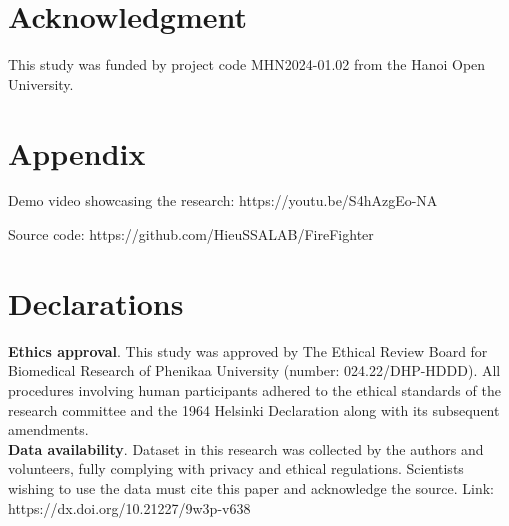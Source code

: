 \documentclass[journal,twoside,web]{ieeecolor}
\begin{document}
\section*{Acknowledgment}
This study was funded by project code MHN2024-01.02 from the Hanoi Open University.

\section*{Appendix}\label{Appendix}
Demo video showcasing the research: https://youtu.be/S4hAzgEo-NA

Source code: https://github.com/HieuSSALAB/FireFighter
\section*{Declarations}\label{Declarations}
\textbf{Ethics approval}. This study was approved by The Ethical Review Board for Biomedical Research of Phenikaa University (number: 024.22/DHP-HDDD). All procedures involving human participants adhered to the ethical standards of the research committee and the 1964 Helsinki Declaration along with its subsequent amendments.\\

\textbf{Data availability}. Dataset in this research was collected by the authors and volunteers, fully complying with privacy and ethical regulations. Scientists wishing to use the data must cite this paper and acknowledge the source.
Link: https://dx.doi.org/10.21227/9w3p-v638



\end{document}
